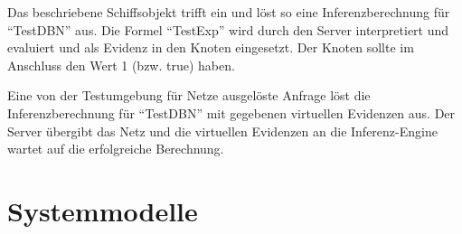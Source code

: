 \documentclass[parskip=full,11pt,twoside]{scrartcl}
\begin{document}
{Das beschriebene Schiffsobjekt trifft ein und löst so eine Inferenzberechnung für \enquote{TestDBN} aus.}
{Die Formel \enquote{TestExp} wird durch den Server interpretiert und evaluiert und als Evidenz in den Knoten eingesetzt. Der Knoten sollte im Anschluss den Wert 1 (bzw. true) haben.}

{Eine von der Testumgebung für Netze ausgelöste Anfrage löst die Inferenzberechnung für \enquote{TestDBN} mit gegebenen virtuellen Evidenzen aus.}
{Der Server übergibt das Netz und die virtuellen Evidenzen an die Inferenz-Engine wartet auf die erfolgreiche Berechnung.}

\pagebreak

\section{Systemmodelle}
\end{document}
